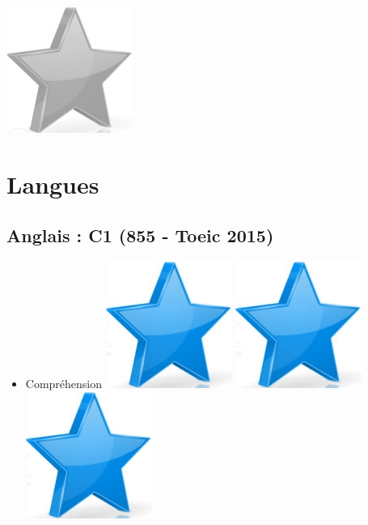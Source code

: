 \documentclass[10pt,a4paper,sans]{article}
\begin{document}
\begin{minipage}[t]{0.28\textwidth}
\begin{mdframed}[style=cadreCompetences]
\begin{itemize}
{                    \includegraphics[scale=0.25]{img/empty_star.png}}
            \end{itemize}

        \section{Langues}
        \subsection{Anglais : C1 \newline (855 - Toeic 2015)}
            \begin{itemize}
                \item{Compréhension
                    \hfill
                    \includegraphics[scale=0.25]{img/star.png} \hspace{-0.22cm}
                    \includegraphics[scale=0.25]{img/star.png} \hspace{-0.22cm}
                    \includegraphics[scale=0.25]{img/star.png} \hspace{-0.22cm}
}
\end{itemize}
\end{mdframed}
\end{minipage}
\end{document}
